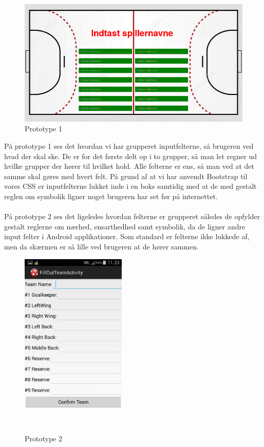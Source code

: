 \begin{figure}[ht!]
\centering
\includegraphics[width=150mm]{images/begin}
\caption{Prototype 1}
\end{figure}
På prototype 1 ses det hvordan vi har grupperet inputfelterne, så brugeren ved hvad der skal ske. De er for det første delt op i to grupper, så man let regner ud hvilke grupper der hører til hvilket hold. Alle felterne er ens, så man ved at det samme skal gøres med hvert felt. På grund af at vi har anvendt Bootstrap til vores CSS er inputfelterne lukket inde i en boks samtidig med at de med gestalt reglen om symbolik ligner noget brugeren har set før på internettet.\\\\

\newpage
På prototype 2 ses det ligeledes hvordan felterne er grupperet således de opfylder gestalt reglerne om nærhed, ensarthedhed samt symbolik, da de ligner andre input felter i Android applikationer. Som standard er felterne ikke lukkede af, men da skærmen er så lille ved brugeren at de hører sammen.
\begin{figure}[ht!]
\centering
\includegraphics[width=50mm]{images/prototype2}
\caption{Prototype 2}
\end{figure}

